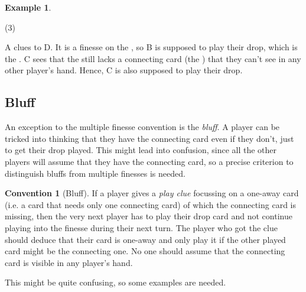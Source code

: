 \documentclass[a4paper]{article}
\theoremstyle{plain}
\theoremstyle{definition}
\newtheorem{example}[theorem]{Example}
\newtheorem{convention}[theorem]{Convention}
\begin{document}
\begin{example}
	\hfill
	\begin{tasks}(3)
		\task[+]      
		\task[A]    
		\task[B]    
		\task[C]    
		\task[D]    
		\task[E]    
	\end{tasks}
	
	A clues  to D. It is a finesse on the , so B is supposed to play their drop, which is the . C sees that the  still lacks a connecting card (the ) that they can't see in any other player's hand. Hence, C is also supposed to play their drop.
\end{example}

\subsection{Bluff}

An exception to the multiple finesse convention is the \textit{bluff}. A player can be tricked into thinking that they have the connecting card even if they don't, just to get their drop played. This might lead into confusion, since all the other players will assume that they have the connecting card, so a precise criterion to distinguish bluffs from multiple finesses is needed.

\begin{convention}[Bluff]
	If a player gives a \emph{play clue} focussing on a one-away card (i.e. a card that needs only one connecting card) of which the connecting card is missing, then the very next player has to play their drop card and not continue playing into the finesse during their next turn. The player who got the clue should deduce that their card is one-away and only play it if the other played card might be the connecting one. No one should assume that the connecting card is visible in any player's hand.
\end{convention}

This might be quite confusing, so some examples are needed.
\end{document}
